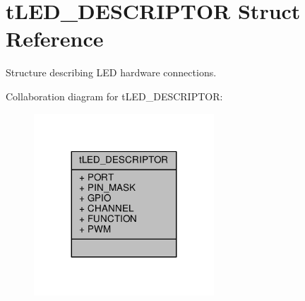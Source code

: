 \hypertarget{structtLED__DESCRIPTOR}{\section{t\+L\+E\+D\+\_\+\+D\+E\+S\+C\+R\+I\+P\+T\+O\+R Struct Reference}
\label{structtLED__DESCRIPTOR}
}


Structure describing L\+E\+D hardware connections.  




Collaboration diagram for t\+L\+E\+D\+\_\+\+D\+E\+S\+C\+R\+I\+P\+T\+O\+R\+:
\nopagebreak
\begin{figure}[H]
\begin{center}
\leavevmode
\includegraphics[width=191pt]{structtLED__DESCRIPTOR__coll__graph}
\end{center}
\end{figure}
